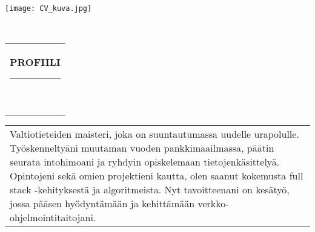 \documentclass[10pt]{article}
\newcommand{\mpwidth}{\linewidth-\fboxsep-\fboxsep}
\newcommand{\cvtext}[1] {
	\begin{tabular*}{1\mpwidth}{p{0.98\mpwidth}}
		\parbox{1\mpwidth}{#1}
	\end{tabular*}
}
\newcommand{\cvsection}[1] {
	\vspace{14pt}
	\cvtext{
		\textbf{\LARGE{\textcolor{darkcol}{\uppercase{#1}}}}\\[-4pt]
		\textcolor{maincol}{ \rule{0.1\textwidth}{2pt} } \\
	}
}
\begin{document}
\setlength{\columnsep}{2.2em}
\setlength{\columnseprule}{4pt}

\begin{paracol}{2}
\begin{leftcolumn}
 \texttt{[image: CV\_kuva.jpg]}


 \vspace{2mm}
 \colorbox{darkcol}{
 \begin{minipage}[c][1cm][c]{.97\mpwidth}
  \begin{center}
   \LARGE{
	\textbf{
	 \textcolor{white}{Akseli Ingervo}
	}
   }
  \end{center}
 \end{minipage}
 }



 \null
 \cvsection{PROFIILI}

 \small\cvtext{
  Valtiotieteiden maisteri, joka on suuntautumassa uudelle urapolulle.
  Työskenneltyäni muutaman vuoden pankkimaailmassa, päätin seurata intohimoani
  ja ryhdyin opiskelemaan tietojenkäsittelyä.
  Opintojeni sekä omien projektieni kautta, olen saanut kokemusta
  full stack -kehityksestä ja algoritmeista. Nyt tavoitteenani on kesätyö, jossa
  pääsen hyödyntämään ja kehittämään verkko-ohjelmointitaitojani.
 } \\[4mm]


\end{leftcolumn}
\end{paracol}
\end{document}
